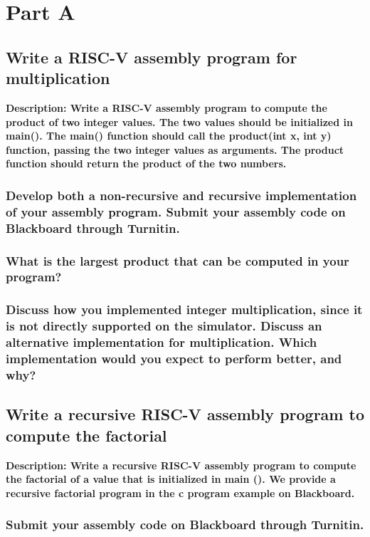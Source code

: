
\section{Part A}

\subsection{Write a RISC-V assembly program for multiplication}
\textbf{Description: Write a RISC-V assembly program to compute the product of two integer values. The two values should be initialized in main(). The main() function should call the product(int x, int y) function, passing the two integer values as arguments. The product function should return the product of the two numbers.}
\subsubsection{Develop both a non-recursive and recursive implementation of your assembly program. Submit your assembly code on Blackboard through Turnitin.}
\subsubsection{What is the largest product that can be computed in your program?}
\subsubsection{Discuss how you implemented integer multiplication, since it is not directly supported on the simulator. Discuss an alternative implementation for multiplication. Which implementation would you expect to perform better, and why?}

\subsection{Write a recursive RISC-V assembly program to compute the factorial}
\textbf{Description: Write a recursive RISC-V assembly program to compute the factorial of a value that is initialized in main (). We provide a recursive factorial program in the c program example on Blackboard.}
\subsubsection{Submit your assembly code on Blackboard through Turnitin.}

